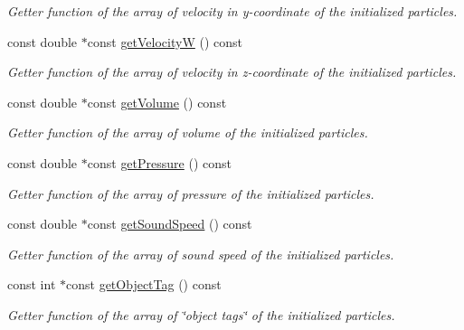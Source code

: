 \begin{DoxyCompactItemize}
\begin{DoxyCompactList}\small\item\em Getter function of the array of velocity in y-\/coordinate of the initialized particles. \end{DoxyCompactList}\item 
const double $\ast$const \hyperlink{classParticleData_a35e82fba85a274782a3485bf99888635}{get\-Velocity\-W} () const 
\begin{DoxyCompactList}\small\item\em Getter function of the array of velocity in z-\/coordinate of the initialized particles. \end{DoxyCompactList}\item 
const double $\ast$const \hyperlink{classParticleData_a27b7864577ba44978a48a8587e9854ac}{get\-Volume} () const 
\begin{DoxyCompactList}\small\item\em Getter function of the array of volume of the initialized particles. \end{DoxyCompactList}\item 
const double $\ast$const \hyperlink{classParticleData_a3713fca18cdeba32c17a244a62dcafdd}{get\-Pressure} () const 
\begin{DoxyCompactList}\small\item\em Getter function of the array of pressure of the initialized particles. \end{DoxyCompactList}\item 
const double $\ast$const \hyperlink{classParticleData_a493cb98a9d33fc3bd48fc879456a426c}{get\-Sound\-Speed} () const 
\begin{DoxyCompactList}\small\item\em Getter function of the array of sound speed of the initialized particles. \end{DoxyCompactList}\item 
const int $\ast$const \hyperlink{classParticleData_abb5cbc18cc19ba33786fabdb6b6bf8be}{get\-Object\-Tag} () const 
\begin{DoxyCompactList}\small\item\em Getter function of the array of \char`\"{}object tags\char`\"{} of the initialized particles. \end{DoxyCompactList}\end{DoxyCompactItemize}
